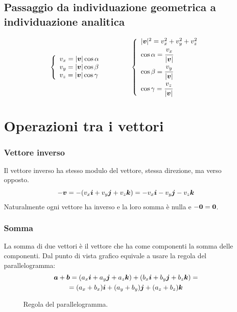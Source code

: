 \subsection{Passaggio da individuazione geometrica a individuazione analitica}
\[
  \left\{
  \begin{array}{l}
    v_x=|\boldsymbol{v}|\cos\alpha \\
    v_y=|\boldsymbol{v}|\cos\beta  \\
    v_z=|\boldsymbol{v}|\cos\gamma
  \end{array}
  \right. \qquad \qquad \left\{
  \begin{array}{l}
    |\boldsymbol{v}|^2=v_x^2+v_y^2+v_z^2     \\
    \cos\alpha=\cfrac{v_x}{|\boldsymbol{v}|} \\
    \cos\beta=\cfrac{v_y}{|\boldsymbol{v}|}  \\
    \cos\gamma=\cfrac{v_z}{|\boldsymbol{v}|}
  \end{array}
  \right.
\]


\section{Operazioni tra i vettori}

\subsubsection{Vettore inverso}
Il vettore inverso ha stesso modulo del vettore, stessa direzione,
ma verso opposto.
\[
  -\boldsymbol{v}=-(v_x\boldsymbol{i}+v_y\boldsymbol{j}+v_z \boldsymbol{k})=-v_x\boldsymbol{i}-v_y\boldsymbol{j}-v_z\boldsymbol{k}
\]
Naturalmente ogni vettore ha inverso e la loro somma è nulla e $-\boldsymbol{0}=\boldsymbol{0}$.

\subsubsection{Somma}
La somma di due vettori è il vettore che ha come componenti la somma delle componenti. Dal punto di vista grafico equivale a usare la regola del parallelogramma:
\begin{multline*}
  \boldsymbol{a}+\boldsymbol{b}=(a_x\boldsymbol{i}+a_y\boldsymbol{j}+a_z \boldsymbol{k})+(b_x\boldsymbol{i}+b_y\boldsymbol{j}+b_z\boldsymbol{k})=\\
  =(a_x+b_x)\boldsymbol{i}+(a_y+b_y)\boldsymbol{j}+(a_z+b_z)\boldsymbol{k}
\end{multline*}

\begin{figure}[htbp]
  \centering
  
  \caption{Regola del parallelogramma.}
\end{figure}


